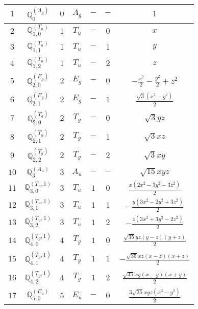 \documentclass[fleqn,10pt,landscape]{article}
\begin{document}
\begin{itemize}
\begin{center}
\begin{longtable}{ccccccc}
$ 1 $ & $ \mathbb{Q}_{0}^{(A_{g})} $ & $ 0 $ & $ A_{g} $ & $ - $ & $ - $ & $ 1 $ \\ \hline
$ 2 $ & $ \mathbb{Q}_{1,0}^{(T_{u})} $ & $ 1 $ & $ T_{u} $ & $ - $ & $ 0 $ & $ x $ \\
$ 3 $ & $ \mathbb{Q}_{1,1}^{(T_{u})} $ & $ 1 $ & $ T_{u} $ & $ - $ & $ 1 $ & $ y $ \\
$ 4 $ & $ \mathbb{Q}_{1,2}^{(T_{u})} $ & $ 1 $ & $ T_{u} $ & $ - $ & $ 2 $ & $ z $ \\ \hline
$ 5 $ & $ \mathbb{Q}_{2,0}^{(E_{g})} $ & $ 2 $ & $ E_{g} $ & $ - $ & $ 0 $ & $ - \frac{x^{2}}{2} - \frac{y^{2}}{2} + z^{2} $ \\
$ 6 $ & $ \mathbb{Q}_{2,1}^{(E_{g})} $ & $ 2 $ & $ E_{g} $ & $ - $ & $ 1 $ & $ \frac{\sqrt{3} \left(x^{2} - y^{2}\right)}{2} $ \\
$ 7 $ & $ \mathbb{Q}_{2,0}^{(T_{g})} $ & $ 2 $ & $ T_{g} $ & $ - $ & $ 0 $ & $ \sqrt{3} y z $ \\
$ 8 $ & $ \mathbb{Q}_{2,1}^{(T_{g})} $ & $ 2 $ & $ T_{g} $ & $ - $ & $ 1 $ & $ \sqrt{3} x z $ \\
$ 9 $ & $ \mathbb{Q}_{2,2}^{(T_{g})} $ & $ 2 $ & $ T_{g} $ & $ - $ & $ 2 $ & $ \sqrt{3} x y $ \\ \hline
$ 10 $ & $ \mathbb{Q}_{3}^{(A_{u})} $ & $ 3 $ & $ A_{u} $ & $ - $ & $ - $ & $ \sqrt{15} x y z $ \\
$ 11 $ & $ \mathbb{Q}_{3,0}^{(T_{u},1)} $ & $ 3 $ & $ T_{u} $ & $ 1 $ & $ 0 $ & $ \frac{x \left(2 x^{2} - 3 y^{2} - 3 z^{2}\right)}{2} $ \\
$ 12 $ & $ \mathbb{Q}_{3,1}^{(T_{u},1)} $ & $ 3 $ & $ T_{u} $ & $ 1 $ & $ 1 $ & $ - \frac{y \left(3 x^{2} - 2 y^{2} + 3 z^{2}\right)}{2} $ \\
$ 13 $ & $ \mathbb{Q}_{3,2}^{(T_{u},1)} $ & $ 3 $ & $ T_{u} $ & $ 1 $ & $ 2 $ & $ - \frac{z \left(3 x^{2} + 3 y^{2} - 2 z^{2}\right)}{2} $ \\ \hline
$ 14 $ & $ \mathbb{Q}_{4,0}^{(T_{g},1)} $ & $ 4 $ & $ T_{g} $ & $ 1 $ & $ 0 $ & $ \frac{\sqrt{35} y z \left(y - z\right) \left(y + z\right)}{2} $ \\
$ 15 $ & $ \mathbb{Q}_{4,1}^{(T_{g},1)} $ & $ 4 $ & $ T_{g} $ & $ 1 $ & $ 1 $ & $ - \frac{\sqrt{35} x z \left(x - z\right) \left(x + z\right)}{2} $ \\
$ 16 $ & $ \mathbb{Q}_{4,2}^{(T_{g},1)} $ & $ 4 $ & $ T_{g} $ & $ 1 $ & $ 2 $ & $ \frac{\sqrt{35} x y \left(x - y\right) \left(x + y\right)}{2} $ \\ \hline
$ 17 $ & $ \mathbb{Q}_{5,0}^{(E_{u})} $ & $ 5 $ & $ E_{u} $ & $ - $ & $ 0 $ & $ \frac{3 \sqrt{35} x y z \left(x^{2} - y^{2}\right)}{2} $ \\

\end{longtable}
\end{center}
\end{itemize}
\end{document}
